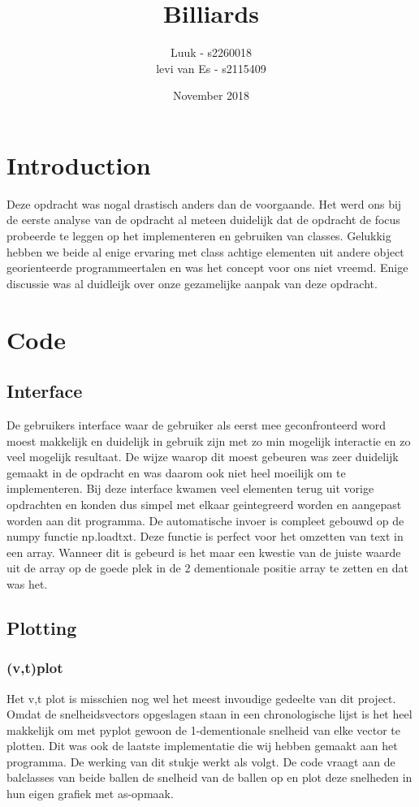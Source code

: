 \documentclass{article}
\title{Billiards}
\author{Luuk - s2260018\\levi van Es - s2115409 }
\date{November 2018}
\begin{document}
\maketitle

\section{Introduction}
    Deze opdracht was nogal drastisch anders dan de voorgaande. 
    Het werd ons bij de eerste analyse van de opdracht al meteen duidelijk dat de opdracht de focus probeerde te leggen op het implementeren en gebruiken van classes. 
    Gelukkig hebben we beide al enige ervaring met class achtige elementen uit andere object georienteerde programmeertalen en was het concept voor ons niet vreemd. 
    Enige discussie was al duidleijk over onze gezamelijke aanpak van deze opdracht. 
    
\section{Code}
\subsection{Interface} 
De gebruikers interface waar de gebruiker als eerst mee geconfronteerd word moest makkelijk en duidelijk in gebruik zijn met zo min mogelijk interactie en zo veel mogelijk resultaat.
De wijze waarop dit moest gebeuren was zeer duidelijk gemaakt in de opdracht en was daarom ook niet heel moeilijk om te implementeren.
Bij deze interface kwamen veel elementen terug uit vorige opdrachten en konden dus simpel met elkaar geintegreerd worden en aangepast worden aan dit programma. 
\newline De automatische invoer is compleet gebouwd op de numpy functie np.loadtxt. 
Deze functie is perfect voor het omzetten van text in een array. Wanneer dit is gebeurd is het maar een kwestie van de juiste waarde uit de array op de goede plek in de 2 dementionale positie array te zetten en dat was het.
\subsection{Plotting}
\subsubsection{(v,t)plot}
Het v,t plot is misschien nog wel het meest invoudige gedeelte van dit project. 
Omdat de snelheidsvectors opgeslagen staan in een chronologische lijst is het heel makkelijk om met pyplot gewoon de 1-dementionale snelheid van elke vector te plotten.
Dit was ook de laatste implementatie die wij hebben gemaakt aan het programma.
De werking van dit stukje werkt als volgt. De code vraagt aan de balclasses van beide ballen de snelheid van de ballen op en plot deze snelheden in hun eigen grafiek met as-opmaak.  
\end{document}

